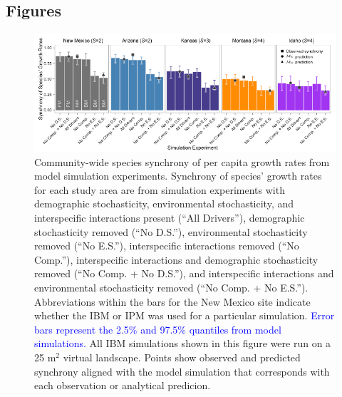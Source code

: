 \documentclass[12pt,]{article}
\begin{document}
\pagebreak{}

\subsection{Figures}\label{figures}

\begin{figure}[!ht]
  \centering
      \includegraphics[width=6in]{./components/formatted_figures/formatted_figure1.png}
  \caption{Community-wide species synchrony of per capita growth rates from model simulation experiments. Synchrony of species' growth rates for each study area are from simulation experiments with demographic stochasticity, environmental stochasticity, and interspecific interactions present (``All Drivers''), demographic stochasticity removed (``No D.S.''), environmental stochasticity removed (``No E.S.''), interspecific interactions removed (``No Comp.''), interspecific interactions and demographic stochasticity removed (``No Comp. + No D.S.''), and interspecific interactions and environmental stochasticity removed (``No Comp. + No E.S.''). Abbreviations within the bars for the New Mexico site indicate whether the IBM or IPM was used for a particular simulation. \textcolor{blue}{Error bars represent the 2.5\% and 97.5\% quantiles from model simulations.} All IBM simulations shown in this figure were run on a 25 $\text{m}^2$ virtual landscape. Points show observed and predicted synchrony aligned with the model simulation that corresponds with each observation or analytical predicion.}
\end{figure}

\pagebreak{}
\end{document}
